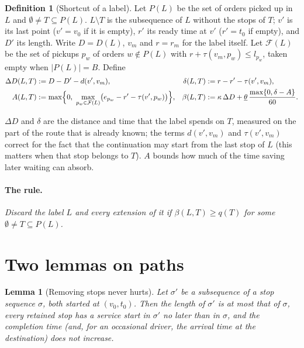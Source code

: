 \documentclass[11pt]{article}
\newtheorem{lemma}[theorem]{Lemma}
\theoremstyle{definition}
\newtheorem{definition}[theorem]{Definition}
\theoremstyle{remark}
\newcommand{\thl}{\underline{\theta}}
\newcommand{\0}{\mathbf{0}}
\begin{document}
\begin{definition}[Shortcut of a label]\label{def:shortcut}
Let $P(L)$ be the set of orders picked up in $L$ and $\emptyset\neq T\subseteq P(L)$.
$L\setminus T$ is the subsequence of $L$ without the stops of $T$; $v'$ is its last point
($v'=v_0$ if it is empty), $r'$ its ready time at $v'$ ($r'=t_0$ if empty), and $D'$ its
length. Write $D=D(L)$, $v_m$ and $r=r_m$ for the label itself. Let $\mathcal F(L)$ be the set
of pickups $p_w$ of orders $w\notin P(L)$ with $r+\tau(v_m,p_w)\le l_{p_w}$, taken empty when
$|P(L)|=B$. Define
\begin{align*}
\Delta D(L,T)&:=D-D'-d(v',v_m), &
\delta(L,T)&:=r-r'-\tau(v',v_m),\\
A(L,T)&:=\max\Bigl\{0,\ \max_{p_w\in\mathcal F(L)}\bigl(e_{p_w}-r'-\tau(v',p_w)\bigr)\Bigr\}, &
\beta(L,T)&:=\kappa\,\Delta D+\thl\,\frac{\max\{0,\delta-A\}}{60}.
\end{align*}
\end{definition}

$\Delta D$ and $\delta$ are the distance and time that the label spends on $T$, measured on the
part of the route that is already known; the terms $d(v',v_m)$ and $\tau(v',v_m)$ correct for the
fact that the continuation may start from the last stop of $L$ (this matters when that stop
belongs to $T$). $A$ bounds how much of the time saving later waiting can absorb.

\paragraph{The rule.} \emph{Discard the label $L$ and every extension of it if
$\beta(L,T)\ge q(T)$ for some $\emptyset\ne T\subseteq P(L)$.}

\section{Two lemmas on paths}

\begin{lemma}[Removing stops never hurts]\label{lem:remove}
Let $\sigma'$ be a subsequence of a stop sequence $\sigma$, both started at $(v_0,t_0)$. Then the
length of $\sigma'$ is at most that of $\sigma$, every retained stop has a service start in
$\sigma'$ no later than in $\sigma$, and the completion time (and, for an occasional driver, the
arrival time at the destination) does not increase.
\end{lemma}
\end{document}
